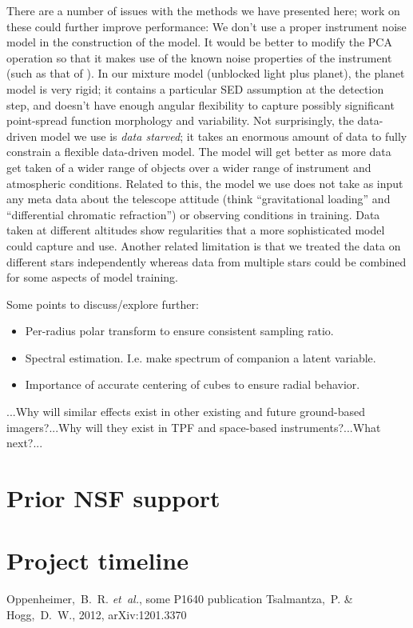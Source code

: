 \documentclass[12pt,pdftex,preprint]{aastex}
\newcommand{\etal}{\textit{et~al.}}
\begin{document}
There are a number of issues with the methods we have presented here;
work on these could further improve performance: We don't use a proper
instrument noise model in the construction of the model.  It would be
better to modify the PCA operation so that it makes use of the known
noise properties of the instrument (such as that of \citealt{hmf}).
In our mixture model (unblocked light plus planet), the planet model
is very rigid; it contains a particular SED assumption at the
detection step, and doesn't have enough angular flexibility to capture
possibly significant point-spread function morphology and variability.
Not surprisingly, the data-driven model we use is \emph{data starved};
it takes an enormous amount of data to fully constrain a flexible
data-driven model.  The model will get better as more data get taken
of a wider range of objects over a wider range of instrument and
atmospheric conditions.  Related to this, the model we use does not
take as input any meta data about the telescope attitude (think
``gravitational loading'' and ``differential chromatic refraction'')
or observing conditions in training.  Data taken at different
altitudes show regularities that a more sophisticated model could
capture and use.  Another related limitation is that we treated the
data on different stars independently whereas data from multiple stars
could be combined for some aspects of model training.

Some points to discuss/explore further:
\begin{itemize}
\item Per-radius polar transform to ensure consistent sampling ratio.
\item Spectral estimation. I.e. make spectrum of companion a latent
  variable.
\item Importance of accurate centering of cubes to ensure radial behavior.
\end{itemize}

...Why will similar effects exist in other existing and future
ground-based imagers?...Why will they exist in TPF and space-based
instruments?...What next?...

\section{Prior NSF support}

\section{Project timeline}

\begin{thebibliography}{}
\bibitem[Oppenheimer \etal(1875)]{p1640}
Oppenheimer,~B.~R. \etal, some P1640 publication
Tsalmantza,~P. \& Hogg,~D.~W., 2012, arXiv:1201.3370
\end{thebibliography}
\end{document}
